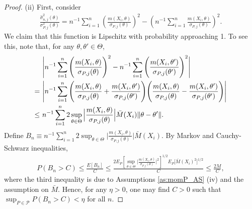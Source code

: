 \documentclass[letterpaper,11pt]{article}
\theoremstyle{myplain}
\theoremstyle{mydefinition}
\theoremstyle{myremark}
\numberwithin{equation}{section}
\numberwithin{figure}{section}
\begin{document}
\begin{appendices}
\begin{proof}
(ii) First, consider
\begin{align}
\frac{\hat\sigma^2_{n,j}(\theta)}{\sigma^2_{P,j}(\theta)}=n^{-1}\sum_{i=1}^n\left(\frac{m(X_i,\theta)}{\sigma_{P,j}(\theta)}\right)^2-\left(n^{-1}\sum_{i=1}^n\frac{m(X_i,\theta)}{\sigma_{P,j}(\theta)}\right)^2.\label{eq:etaLip1}
\end{align}
We claim that this function is Lipschitz with probability approaching 1. To see this, note that, for any $\theta,\theta'\in\Theta$,
\begin{align}
&~ \Bigg|n^{-1}\sum_{i=1}^n\Bigg(\frac{m(X_i,\theta)}{\sigma_{P,j}(\theta)}\Bigg)^2 -n^{-1}\sum_{i=1}^n\Bigg(\frac{m(X_i,\theta')}{\sigma_{P,j}(\theta')}\Bigg)^2\Bigg|\notag\\
=&~\Bigg|n^{-1}\sum_{i=1}^n \Bigg(\frac{m(X_i,\theta)}{\sigma_{P,j}(\theta)}+\frac{m(X_i,\theta')}{\sigma_{P,j}(\theta')}\Bigg)\Bigg(\frac{m(X_i,\theta)}{\sigma_{P,j}(\theta)}-\frac{m(X_i,\theta')}{\sigma_{P,j}(\theta')}\Bigg)\Bigg|	\notag\\
\le&~ n^{-1}\sum_{i=1}^n 2\sup_{\theta\in\Theta}\Big|\frac{m(X_i,\theta)}{\sigma_{P,j}(\theta)}\Big|\bar M(X_i)\|\theta-\theta'\|.\label{eq:etaLip2}
\end{align}
Define $B_n\equiv n^{-1}\sum_{i=1}^n 2\sup_{\theta\in\Theta}\Big|\frac{m(X_i,\theta)}{\sigma_{P,j}(\theta)}\Big|\bar M(X_i)$. By Markov and Cauchy-Schwarz inequalities,
\begin{align}
	P(B_n>C)\le \frac{E[B_n]}{C}\le\frac{2E_P\left[\sup_{\theta\in\Theta}\Big|\frac{m(X_i,\theta)}{\sigma_{P,j}(\theta)}\Big|^2 \right]^{1/2}E_P\Big[\bar M(X_i)^2 \Big]^{1/2}}{C} \le \frac{2M}{C},\label{eq:etaLip3}
\end{align}
where the third inequality is due to Assumptions \ref{as:momP_AS} (iv) and the assumption on $\bar M$. Hence, for any $\eta>0$, one may find $C>0$ such that $\sup_{P\in\mathcal P}P(B_n>C)<\eta$ for all $n$.


\end{proof}
\end{appendices}
\end{document}
